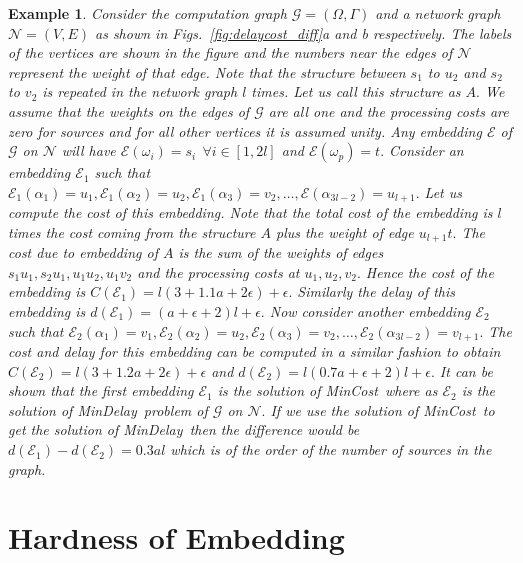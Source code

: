 \documentclass[journal]{IEEEtran}
\newtheorem{example}{{\bf Example}}
\newcommand{\net}{\mathcal{N}}
\newcommand{\netnodes}{V}
\newcommand{\netedges}{E}
\newcommand{\compgraph}{\mathcal{G}}
\newcommand{\compnodes}{\Omega}
\newcommand{\compedges}{\Gamma}
\newcommand{\mincost}{\textsf{MinCost}}
\newcommand{\mindelay}{\textsf{MinDelay}}
\newcommand{\embedding}{\mathcal{E}}
\begin{document}
\begin{example}
  \label{ex:compare}
  Consider the computation graph $\compgraph =
  (\compnodes,\compedges)$ and a network graph
  $\net=(\netnodes,\netedges)$ as shown in
  Figs.~\ref{fig:delaycost_diff}a and b respectively. The labels of
  the vertices are shown in the figure and the numbers near the edges
  of $\net$ represent the weight of that edge. Note that the structure
  between $s_1$ to $u_2$ and $s_2$ to $v_2$ is repeated in the network
  graph $l$ times. Let us call this structure as $A.$ We assume that
  the weights on the edges of $\compgraph$ are all one and the
  processing costs are zero for sources and for all other vertices it
  is assumed unity. Any embedding $\embedding$ of $\compgraph$ on
  $\net$ will have $\embedding(\omega_i) = s_i \ \ \forall i \in
  [1,2l]$ and $\embedding(\omega_p) = t.$ Consider an embedding
  $\embedding_1$ such that $\embedding_1(\alpha_1) =
  u_1,\embedding_1(\alpha_2) = u_2, \embedding_1(\alpha_3) = v_2,
  \ldots, \embedding(\alpha_{3l-2}) = u_{l+1}.$ Let us compute the
  cost of this embedding. Note that the total cost of the embedding is
  $l$ times the cost coming from the structure $A$ plus the weight of
  edge $u_{l+1}t.$ The cost due to embedding of $A$ is the sum of the
  weights of edges $s_1u_1,s_2u_1, u_1u_2,u_1v_2$ and the processing
  costs at $u_1,u_2,v_2.$ Hence the cost of the embedding is
  $C(\embedding_1) = l(3+1.1a+2\epsilon) +\epsilon.$ Similarly the
  delay of this embedding is $d(\embedding_1) = (a+\epsilon+2)l
  +\epsilon.$ Now consider another embedding $\embedding_2$ such that
  $\embedding_2(\alpha_1) = v_1,\embedding_2(\alpha_2) = u_2,
  \embedding_2(\alpha_3) = v_2, \ldots, \embedding_2(\alpha_{3l-2}) =
  v_{l+1}.$ The cost and delay for this embedding can be computed in a
  similar fashion to obtain $C(\embedding_2) = l(3+1.2a+2\epsilon)
  +\epsilon$ and $d(\embedding_2) = l(0.7a +\epsilon +2)l +\epsilon.$
  It can be shown that the first embedding $\embedding_1$ is the
  solution of \mincost\ where as $\embedding_2$ is the solution of
  \mindelay\ problem of $\compgraph$ on $\net.$ If we use the solution
  of \mincost\ to get the solution of \mindelay\ then the difference
  would be $d(\embedding_1)-d(\embedding_2) = 0.3al$ which is of the
  order of the number of sources in the graph.
\end{example}



\section{Hardness of Embedding}
\label{sec:hardness}
\end{document}
